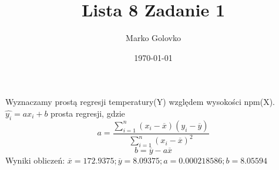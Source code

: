 \documentclass[12pt]{article}
\title{Lista 8 Zadanie 1}
\author{Marko Golovko}
\date{\today}
\begin{document}
\maketitle
Wyznaczamy prostą regresji temperatury(Y) względem wysokości npm(X). \\
$\hat{y_{i}}=ax_{i}+b $ prosta regresji, gdzie  
$$a=\frac{\sum_{i=1}^{n}(x_{i}-\overline{x})(y_{i}-\overline{y})}
         {\sum_{i=1}^{n}(x_{i}-\overline{x})^2}$$  
$$ b = \overline{y} - a\overline{x}$$ 
Wyniki obliczeń: $\overline{x} = 172.9375; \overline{y} = 8.09375; 
a = 0.000218586; b = 8.05594$    

\end{document}
